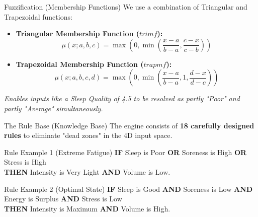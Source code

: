 \documentclass[11pt]{beamer}
\begin{document}
\begin{frame}{Fuzzification (Membership Functions)}
  We use a combination of Triangular and Trapezoidal functions:
  \begin{itemize}
      \item \textbf{Triangular Membership Function ($trimf$):}
      \begin{equation*}
      \mu(x; a, b, c) = \max\left(0, \min\left(\frac{x-a}{b-a}, \frac{c-x}{c-b}\right)\right)
      \end{equation*}
      \item \textbf{Trapezoidal Membership Function ($trapmf$):}
      \begin{equation*}
      \mu(x; a, b, c, d) = \max\left(0, \min\left(\frac{x-a}{b-a}, 1, \frac{d-x}{d-c}\right)\right)
      \end{equation*}
  \end{itemize}
  \textit{Enables inputs like a Sleep Quality of 4.5 to be resolved as partly "Poor" and partly "Average" simultaneously.}
\end{frame}

\begin{frame}{The Rule Base (Knowledge Base)}
  The engine consists of \textbf{18 carefully designed rules} to eliminate "dead zones" in the 4D input space.
  
  \vspace{0.3cm}
  \begin{block}{Rule Example 1 (Extreme Fatigue)}
    \textbf{IF} Sleep is Poor \textbf{OR} Soreness is High \textbf{OR} Stress is High \\
    \textbf{THEN} Intensity is Very Light \textbf{AND} Volume is Low.
  \end{block}
  
  \begin{block}{Rule Example 2 (Optimal State)}
    \textbf{IF} Sleep is Good \textbf{AND} Soreness is Low \textbf{AND} Energy is Surplus \textbf{AND} Stress is Low \\
    \textbf{THEN} Intensity is Maximum \textbf{AND} Volume is High.
  \end{block}
\end{frame}
\end{document}
